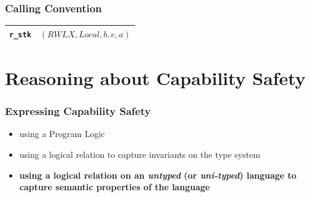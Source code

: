 \documentclass{beamer}
\begin{document}
\begin{frame}
\frametitle{Calling Convention}

\begin{longtable}[c]{|l|l|}
\hline
\texttt{r\_stk} & $(RWLX,Local,b,e,a)$ \\ \hline
\endfirsthead
%
\endhead
\end{longtable}

\end{frame}

\section{Reasoning about Capability Safety}

\begin{frame}
\frametitle{Expressing Capability Safety}

\begin{itemize}
	\item<2-> using a Program Logic 
	\item<3-> using a logical relation to capture invariants on the type system
	\item<4-> \textbf{using a logical relation on an \emph{untyped} (or \emph{uni-typed}) language to capture semantic properties of the language}
\end{itemize}

\end{frame}
\end{document}

